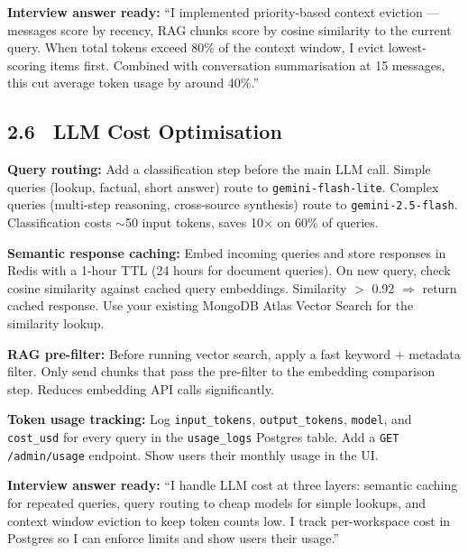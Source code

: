 \documentclass[11pt, a4paper]{article}
\DeclareRobustCommand{\badge}[2]{%
  \tikz[baseline=(n.base)]{
    \node[inner sep=3pt, rounded corners=3pt,
          fill=#1!15, text=#1!70!black,
          font=\fontsize{8}{8}\selectfont\bfseries] (n) {#2};
  }%
}
\DeclareRobustCommand{\high}{\badge{warning}{HIGH}}
\begin{document}
\begin{successbox}
\textbf{Interview answer ready:} ``I implemented priority-based context eviction — messages score by recency, RAG chunks score by cosine similarity to the current query. When total tokens exceed 80\% of the context window, I evict lowest-scoring items first. Combined with conversation summarisation at 15 messages, this cut average token usage by around 40\%.''
\end{successbox}

\subsection{2.6 \ LLM Cost Optimisation \hfill \high}

\begin{checklist}
  \item \textbf{Query routing:} Add a classification step before the main LLM call. Simple queries (lookup, factual, short answer) route to \texttt{gemini-flash-lite}. Complex queries (multi-step reasoning, cross-source synthesis) route to \texttt{gemini-2.5-flash}. Classification costs $\sim$50 input tokens, saves 10$\times$ on 60\% of queries.

  \item \textbf{Semantic response caching:} Embed incoming queries and store responses in Redis with a 1-hour TTL (24 hours for document queries). On new query, check cosine similarity against cached query embeddings. Similarity $>$ 0.92 $\Rightarrow$ return cached response. Use your existing MongoDB Atlas Vector Search for the similarity lookup.

  \item \textbf{RAG pre-filter:} Before running vector search, apply a fast keyword + metadata filter. Only send chunks that pass the pre-filter to the embedding comparison step. Reduces embedding API calls significantly.

  \item \textbf{Token usage tracking:} Log \texttt{input\_tokens}, \texttt{output\_tokens}, \texttt{model}, and \texttt{cost\_usd} for every query in the \texttt{usage\_logs} Postgres table. Add a \texttt{GET /admin/usage} endpoint. Show users their monthly usage in the UI.
\end{checklist}

\begin{successbox}
\textbf{Interview answer ready:} ``I handle LLM cost at three layers: semantic caching for repeated queries, query routing to cheap models for simple lookups, and context window eviction to keep token counts low. I track per-workspace cost in Postgres so I can enforce limits and show users their usage.''
\end{successbox}
\end{document}
